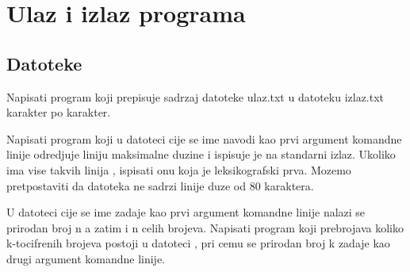 
\chapter{Ulaz i izlaz programa}



\section{Datoteke}

\begin{Exercise}[label=v3_01] 
Napisati program koji prepisuje sadrzaj datoteke ulaz.txt u
datoteku izlaz.txt karakter po karakter.
\end{Exercise}
\ifresenja
\begin{Answer}[ref=v3_01]
\end{Answer}
\fi

\begin{Exercise}[label=v3_02] 
Napisati program koji u datoteci cije se ime navodi kao prvi
argument komandne linije odredjuje liniju maksimalne duzine i
ispisuje je na standarni izlaz. Ukoliko ima vise takvih linija ,
ispisati onu koja je leksikografski prva. Mozemo pretpostaviti
da datoteka ne sadrzi linije duze od 80 karaktera.
\end{Exercise}
\ifresenja
\begin{Answer}[ref=v3_02]
\end{Answer}
\fi

\begin{Exercise}[label=v3_03] 
U datoteci cije se ime zadaje kao prvi argument komandne linije
nalazi se
prirodan broj n a zatim i n celih brojeva. Napisati program koji
prebrojava
koliko k-tocifrenih brojeva postoji u datoteci , pri cemu se
prirodan broj k
zadaje kao drugi argument komandne linije.

\end{Exercise}
\ifresenja
\begin{Answer}[ref=v3_03]
\end{Answer}
\fi

